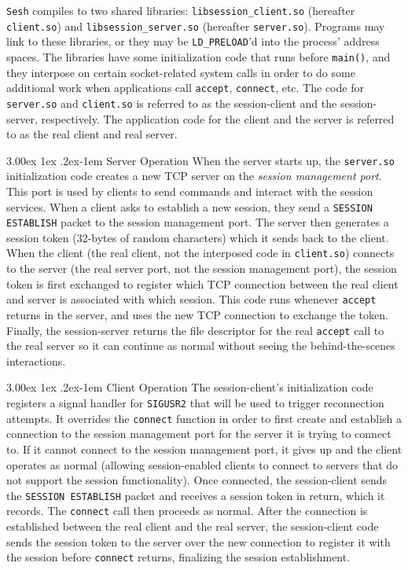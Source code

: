\documentclass[twocolumn,11pt]{article}
\makeatletter
\newcommand{\Sesh}{\texttt{Sesh}\xspace}
\renewcommand{\paragraph}{%
  \@startsection{paragraph}{4}%
  {\z@}{3.00ex \@plus 1ex \@minus .2ex}{-1em}%
  {\normalfont\normalsize\bfseries}%
}
\makeatother
\begin{document}
\newcommand{\clientso}{\texttt{client.so}\xspace}
\newcommand{\serverso}{\texttt{server.so}\xspace}

\Sesh compiles to two shared libraries: \texttt{libsession\_client.so}
(hereafter \clientso) and \texttt{libsession\_server.so} (hereafter \serverso).
Programs may link to these libraries, or they may be \texttt{LD\_PRELOAD}'d into
the process' address spaces. The libraries have some initialization code that
runs before \texttt{main()}, and they interpose on certain socket-related system
calls in order to do some additional work when applications call
\texttt{accept}, \texttt{connect}, etc. The code for \serverso and \clientso is
referred to as the session-client and the session-server, respectively. The
application code for the client and the server is referred to as the real client
and real server.

\paragraph{Server Operation}
When the server starts up, the \serverso initialization code creates a new TCP
server on the \textit{session management port}. This port is used by clients to
send commands and interact with the session services.
When a client asks to
establish a new session, they send a \texttt{SESSION ESTABLISH} packet to the
session management port. The server then generates a session token (32-bytes of
random characters) which it sends back to the client. When the client (the real
client, not the interposed code in \clientso) connects to the server (the real
server port, not the session management port), the session token is first
exchanged to register which TCP connection between the real client and server is
associated with which session. This code runs whenever \texttt{accept} returns
in the server, and uses the new TCP connection to exchange the token. Finally,
the session-server returns the file descriptor for the real \texttt{accept} call to the
real server so it can continue as normal without seeing the behind-the-scenes
interactions.


\paragraph{Client Operation}
The session-client's initialization code registers a signal handler for
\texttt{SIGUSR2} that will be used to trigger reconnection attempts. It
overrides the \texttt{connect} function in order to first create and establish a
connection to the session management port for the server it is trying to connect
to. If it cannot connect to the session management port, it gives up and the
client operates as normal (allowing session-enabled clients to connect to
servers that do not support the session functionality). Once connected, the
session-client sends the \texttt{SESSION ESTABLISH} packet and receives a
session token in return, which it records. The \texttt{connect} call then proceeds as
normal. After the connection is established between the real client and the real
server, the session-client code sends the session token to the server over the
new connection to register it with the session before
\texttt{connect} returns, finalizing the session establishment.
\end{document}
